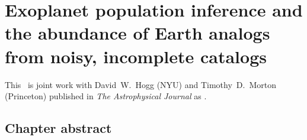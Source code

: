 \renewcommand{\chapid}{exopop}

\newcommand{\True}{\foreign{True}}
\newcommand{\Truth}{\foreign{Truth}}

\newcommand{\densityunit}{{\ensuremath{\mathrm{nat}^{-2}}}}
\newcommand{\rate}{\ensuremath{\Gamma}}
\newcommand{\ratepar}{{\ensuremath{\theta}}}
\newcommand{\ratepars}{{\ensuremath{\bvec{\ratepar}}}}
\newcommand{\obs}[1]{\ensuremath{\hat{#1}}}
\newcommand{\radius}{\ensuremath{R}}
\newcommand{\period}{\ensuremath{P}}
\newcommand{\completeness}{{\ensuremath{Q_\mathrm{c}}}}
\newcommand{\transitprob}{{\ensuremath{Q_\mathrm{t}}}}
\renewcommand{\data}{{\ensuremath{\bvec{x}}}}
\newcommand{\entry}{{\ensuremath{\bvec{w}}}}
\newcommand{\catalog}{{\ensuremath{\bvec{\entry}}}}
\newcommand{\interim}{{\ensuremath{\bvec{\alpha}}}}
\newcommand{\binarea}{{\ensuremath{\Delta}}}
\newcommand{\bincenter}{{\ensuremath{\bvec{x}}}}
\newcommand{\binheight}{{\ensuremath{w}}}
\newcommand{\binheights}{{\ensuremath{\bvec{\binheight}}}}
\newcommand{\mean}{{\ensuremath{\mu}}}
\newcommand{\smooth}{{\ensuremath{\lambda}}}
\newcommand{\smoothpars}{{\ensuremath{\bvec{\smooth}}}}
\newcommand{\cov}{{\ensuremath{\mathrm{K}}}}
\newcommand{\modela}{\emph{Catalog A}}
\newcommand{\modelb}{\emph{Catalog B}}
\newcommand{\gammaearth}{{\ensuremath{\rate_\oplus}}}
\newcommand{\resultsurl}{\url{http://dx.doi.org/10.5281/zenodo.11507}}


\makeatletter
\renewcommand{\@makefnmark}{\hbox{\textsuperscript{\footnotesize{\@thefnmark}}}}
\makeatother

\chapter{Exoplanet population inference and the abundance
         of Earth analogs from noisy, incomplete catalogs}

This \paper\ is joint work with David~W.~Hogg (NYU) and Timothy~D.~Morton
(Princeton) published in \emph{The Astrophysical Journal} as
\citet{Foreman-Mackey:2014}.

\section{Chapter abstract}


